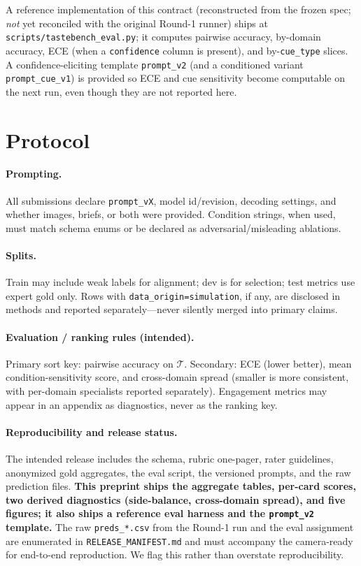 \documentclass[11pt,a4paper]{article}
\begin{document}
A reference implementation of this contract (reconstructed from the frozen spec; \emph{not} yet reconciled with the original Round-1 runner) ships at \texttt{scripts/tastebench\_eval.py}; it computes pairwise accuracy, by-domain accuracy, ECE (when a \texttt{confidence} column is present), and by-\texttt{cue\_type} slices. A confidence-eliciting template \texttt{prompt\_v2} (and a conditioned variant \texttt{prompt\_cue\_v1}) is provided so ECE and cue sensitivity become computable on the next run, even though they are not reported here.

\section{Protocol}
\label{sec:protocol}

\paragraph{Prompting.} All submissions declare \texttt{prompt\_vX}, model id/revision, decoding settings, and whether images, briefs, or both were provided. Condition strings, when used, must match schema enums or be declared as adversarial/misleading ablations.

\paragraph{Splits.} Train may include weak labels for alignment; dev is for selection; test metrics use expert gold only. Rows with \texttt{data\_origin=simulation}, if any, are disclosed in methods and reported separately---never silently merged into primary claims.

\paragraph{Evaluation / ranking rules (intended).} Primary sort key: pairwise accuracy on $\mathcal{T}$. Secondary: ECE (lower better), mean condition-sensitivity score, and cross-domain spread (smaller is more consistent, with per-domain specialists reported separately). Engagement metrics may appear in an appendix as diagnostics, never as the ranking key.

\paragraph{Reproducibility and release status.} The intended release includes the schema, rubric one-pager, rater guidelines, anonymized gold aggregates, the eval script, the versioned prompts, and the raw prediction files. \textbf{This preprint ships the aggregate tables, per-card scores, two derived diagnostics (side-balance, cross-domain spread), and five figures; it also ships a reference eval harness and the \texttt{prompt\_v2} template.} The raw \texttt{preds\_*.csv} from the Round-1 run and the eval assignment are enumerated in \texttt{RELEASE\_MANIFEST.md} and must accompany the camera-ready for end-to-end reproduction. We flag this rather than overstate reproducibility.
\end{document}
